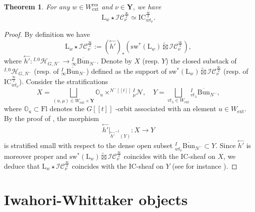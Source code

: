 \documentclass[11pt]{amsart}
\theoremstyle{plain}
\newtheorem{thm}{Theorem}[section]
\theoremstyle{remark}
\numberwithin{equation}{section}
\begin{document}
	\begin{thm}{{\cite[Theorem 5.3.2]{ABBGM}}}\label{thm conv simples}
		For any $w\in W^{\mathrm{res}}_\mathrm{ext}$ and $\nu\in\mathbf{Y}$, we have
		$$\mathrm{L}_w\star\mathcal{IC}^{\frac{\infty}{2}}_\nu\simeq\mathrm{IC}^{\frac{\infty}{2}}_{wt_{\nu}}. $$
	\end{thm}
 \begin{proof}
     By definition we have 
     $$\mathrm{L}_w\star\mathcal{IC}^{\frac{\infty}{2}}_\nu:=(\overset{\leftarrow}{h'})_*(\mathrm{sw}^*(\mathrm{L}_w)\widetilde{\boxtimes}\mathcal{IC}^{\frac{\infty}{2}}_\nu),$$
     where $\overset{\leftarrow}{h'}:{^{I,0}\mathcal{H}_{G,N^{-}}}\to {^{I}_\infty\overline{\mathrm{Bun}}_{N^-}}$. Denote by $X$ (resp. $Y$) the closed substack of ${^{I,0}\mathcal{H}_{G,N^{-}}}$ (resp. of ${^{I}_\infty\overline{\mathrm{Bun}}_{N^-}}$) defined as the support of $\mathrm{sw}^*(\mathrm{L}_w)\widetilde{\boxtimes}\mathcal{IC}^{\frac{\infty}{2}}_\nu$ (resp. of $\mathrm{IC}^{\frac{\infty}{2}}_{wt_{\nu}}$). Consider the stratifications  
     $$X=\bigsqcup_{(u,\mu)\in W_\mathrm{ext}\times \mathbf{Y}}\mathbb{O}_u\times^{N^-[[t]]}{^I_\mu\mathcal{N}},\quad  Y=\bigsqcup_{vt_\lambda\in W_\mathrm{ext}}{^{I}_{vt_\lambda}\overline{\mathrm{Bun}}_{N^-}},$$
     where $\mathbb{O}_u\subset \mathrm{Fl}$ denotes the $G[[t]]$ -orbit associated with an element $u\in W_\mathrm{ext}$. By the proof of {\cite[Theorem 5.3.2]{ABBGM}}, the morphism 
     $$\overset{\leftarrow}{h'}|_{\overset{\leftarrow}{h'}^{-1}(Y)}:X\to Y$$ is stratified small with respect to the dense open subset ${^{I}_{wt_\nu}\overline{\mathrm{Bun}}_{N^-}}\subset Y$. Since $\overset{\leftarrow}{h'}$ is moreover proper and $\mathrm{sw}^*(\mathrm{L}_w)\widetilde{\boxtimes}\mathcal{IC}^{\frac{\infty}{2}}_\nu$ coincides with the IC-sheaf on $X$, we deduce that $\mathrm{L}_w\star\mathcal{IC}^{\frac{\infty}{2}}_\nu$ coincides with the IC-sheaf on $Y$ (see for instance \cite[Proposition 3.8.10]{achar2021perverse}).
 \end{proof}
	\section{Iwahori-Whittaker objects}
	
	
\end{document}
